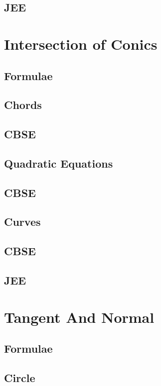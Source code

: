 \documentclass[journal]{IEEEtran}
\begin{document}
\subsection{JEE}
 
\newpage
\section{Intersection of Conics}
\subsection{Formulae}

\subsection{Chords}

\subsection{CBSE}

\subsection{Quadratic Equations}

\subsection{CBSE}

\subsection{Curves}

\subsection{CBSE}

\subsection{JEE}
 

\newpage
\section{Tangent And Normal}
\subsection{Formulae}

\subsection{Circle}

\end{document}
